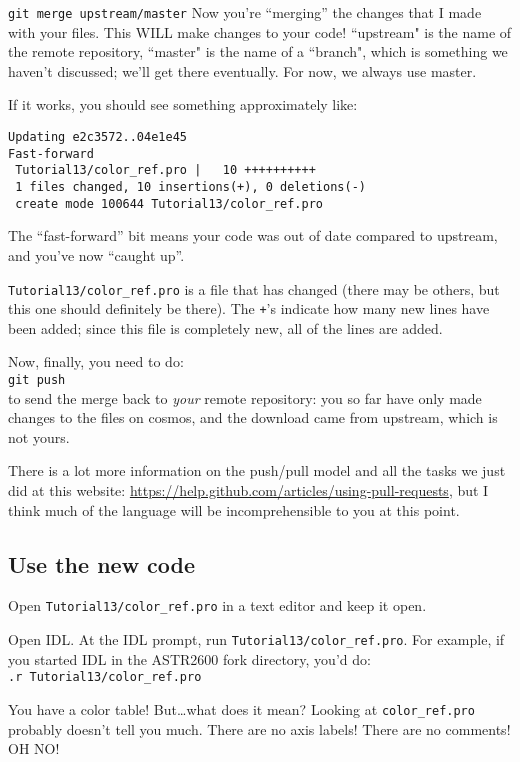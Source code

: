 \documentclass{article}
\begin{document}
\begin{spacing}{1.0}
\verb|git merge upstream/master|
Now you're ``merging'' the changes that I made with your files.  This WILL
make changes to your code!  “upstream" is the name of the remote repository,
“master" is the name of a “branch", which is something we haven't discussed;
we'll get there eventually.  For now, we always use master.

If it works, you should see something approximately like:
\begin{lstlisting}
Updating e2c3572..04e1e45
Fast-forward
 Tutorial13/color_ref.pro |   10 ++++++++++
 1 files changed, 10 insertions(+), 0 deletions(-)
 create mode 100644 Tutorial13/color_ref.pro
\end{lstlisting}    

The ``fast-forward'' bit means your code was out of date compared to upstream,
and you've now ``caught up''.  

\verb|Tutorial13/color_ref.pro| is a file that has changed (there may be
others, but this one should definitely be there).  The \verb|+|'s indicate how
many new lines have been added; since this file is completely new, all of the
lines are added.

Now, finally, you need to do:\\
\verb|git push| \\
to send the merge back to \emph{your} remote repository: you so far have only
made changes to the files on cosmos, and the download came from upstream, which
is not yours.

There is a lot more information on the push/pull model and all the tasks we
just did at this website:
\url{https://help.github.com/articles/using-pull-requests}, but I think much of
the language will be incomprehensible to you at this point.  

\subsection{Use the new code}
Open \verb|Tutorial13/color_ref.pro| in a text editor and keep it open.

Open IDL.  At the IDL prompt, run \verb|Tutorial13/color_ref.pro|.
For example, if you started IDL in the ASTR2600 fork directory, you'd do:\\
\verb|.r Tutorial13/color_ref.pro|

You have a color table!  But\dots what does it mean?  Looking at
\verb|color_ref.pro| probably doesn't tell you much.  There are no axis labels!
There are no comments!  OH NO!


\end{spacing}
\end{document}
